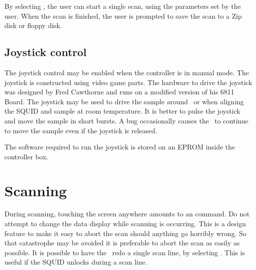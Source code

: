 By selecting , the user can start a single scan,
using
the parameters set by the user. When the scan is finished, the
user is prompted to save the scan to a Zip disk or floppy disk.

\subsection{Joystick control}

The joystick control may be enabled when the controller is in manual mode.
The joystick is constructed using video game parts. The hardware to drive
the joystick was designed by Fred Cawthorne and runs on a modified 
version of his 6811 Board\cite{cawthorne_gpib_manual,cawthorne_phdthesis}. 
The joystick may be used to drive the sample 
around \insitu\ or when aligning the SQUID and sample at room temperature. 
\label{Joystickbugs}
It is better to pulse the joystick and move the sample in short
bursts.
A bug occasionally causes the \squidbox\ to continue to move 
the sample even if the joystick is released. 

The software required to run the joystick is stored on an EPROM inside
the controller box. 

\section{Scanning}

During scanning, touching the screen anywhere amounts to an  
command.
Do not attempt to change the data display while scanning is occurring. 
This is a design feature to make it easy to abort the scan should anything
go 
horribly wrong. So that catastrophe may be avoided
it is preferable to abort the scan as easily as
possible. 
It is possible to have the \squidbox\ redo a single scan line,
by selecting . This is useful if the SQUID unlocks during
a scan line.




